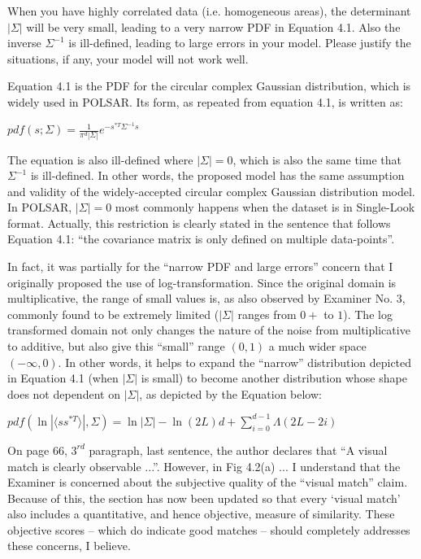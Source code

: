 \replyToComment
    {When you have highly correlated data (i.e. homogeneous areas), the determinant $|\Sigma|$ will be very small, leading to a very narrow PDF in Equation 4.1.
Also the inverse $\Sigma^{-1}$ is ill-defined, leading to large errors in your model.
Please justify the situations, if any, your model will not work well.}
    {Equation 4.1 is the PDF for the circular complex Gaussian distribution, which is widely used in POLSAR.
Its form, as repeated from equation 4.1, is written as:

\begin{center}
  $pdf(s;\Sigma)=\frac{1}{\pi^d |\Sigma|} e^{-s^{*T}\Sigma^{-1}s}$
\end{center}

The equation is also ill-defined where $|\Sigma|=0$, which is also the same time that $\Sigma^{-1}$ is ill-defined.
In other words, the proposed model has the same assumption and validity of the widely-accepted circular complex Gaussian distribution model.
In POLSAR, $|\Sigma|=0$ most commonly happens when the dataset is in Single-Look format.
Actually, this restriction is clearly stated in the sentence that follows Equation 4.1: ``the covariance matrix is only defined on multiple data-points''. %

In fact, it was partially for the ``narrow PDF and large errors'' concern that I originally proposed the use of log-transformation.
Since the original domain is multiplicative, the range of small values is, as also observed by Examiner No. 3, commonly found to be extremely limited ($|\Sigma|$ ranges from $0+$ to $1$).
The log transformed domain not only changes the nature of the noise from multiplicative to additive, but also give this ``small'' range $(0,1)$ a much wider space $(-\infty,0)$.
In other words, it helps to expand the ``narrow'' distribution depicted in Equation 4.1 (when $|\Sigma|$ is small) to become another distribution whose shape does not dependent on $|\Sigma|$, as depicted by the Equation below:

\begin{center}
  $pdf( \ln | \langle ss^{*T} \rangle|, \Sigma) = \ln |\Sigma| - \ln(2L)d + \sum^{d-1}_{i=0} \Lambda (2L-2i)$
\end{center}
}

\replyToComment
    {On page 66, $3^{rd}$ paragraph, last sentence, the author declares that ``A visual match is clearly observable ...''.
However, in Fig 4.2(a) ...}
    {I understand that the Examiner is concerned about the subjective quality of the ``visual match'' claim. 
Because of this, the section has now been updated so that every `visual match' also includes a quantitative, and hence objective, measure of similarity.
These objective scores -- which do indicate good matches -- should completely addresses these concerns, I believe.}

